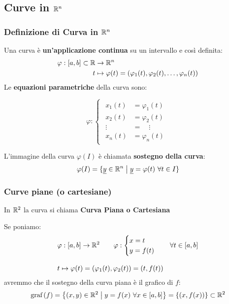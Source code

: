 \subsection{Curve in \texorpdfstring{\(\mathbb{R}^{n} \)}{Rn}}

\subsubsection{Definizione di Curva in \texorpdfstring{\(\mathbb{R}^{n} \)}{Rn}}

Una curva è \textbf{un'applicazione continua} su un intervallo e così definita:
\begin{align*}
    \varphi: [a,b] \subset \mathbb{R} & \rightarrow \mathbb{R}^{n}                                                        \\
    t                         & \mapsto \varphi(t) = (\varphi_1(t),\varphi_2(t), \ldots ,\varphi_n(t))
\end{align*}
Le \textbf{equazioni parametriche} della curva sono:

\begin{equation*}
    \varphi:
    \begin{cases}
        \begin{aligned}
            x_1(t)      & = \varphi_1(t) \\
            x_2(t)      & = \varphi_2(t) \\
            \vdots\quad & = \quad\vdots  \\
            x_n(t)      & = \varphi_n(t)
        \end{aligned}
    \end{cases}
\end{equation*}

L'immagine della curva \(\varphi(I)\) è chiamata \textbf{sostegno della curva}:
\[
    \varphi(I) = \{\underline{y} \in \mathbb{R}^{n} \;\big|\; \underline{y} = \varphi(t) ~\forall t \in I\}
\]

\subsubsection{Curve piane (o cartesiane)}

In \(\mathbb{R}^2\) la curva si chiama \textbf{Curva Piana o Cartesiana}

Se poniamo:
\begin{align*}
     & \varphi: [a,b]\rightarrow \mathbb{R}^{2} \qquad \varphi: \begin{cases}
                                                            x = t \\
                                                            y = f(t)
                                                        \end{cases} \quad \forall t \in [a,b] \\[3mm]
     & t \mapsto \varphi(t) = (\varphi_1(t), \varphi_2(t)) = (t,f(t))
\end{align*}
avremmo che il sostegno della curva piana è il grafico di \(f\):
\[
    \text{graf}\left(f\right) = \left\{(x,y) \in \mathbb{R}^2 \;\big|\; y=f(x) ~\forall x \in [a,b]\right\} = \left\{(x,f(x))\right\} \subset \mathbb{R}^2
\]

